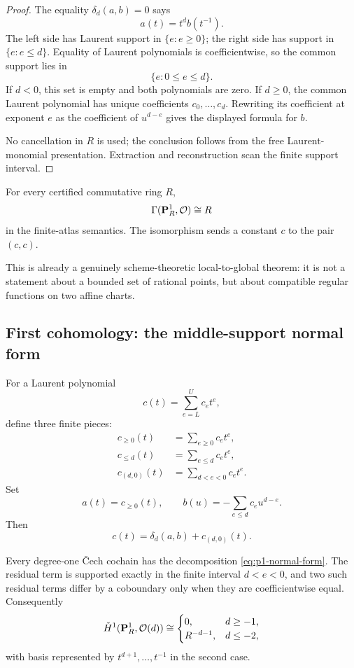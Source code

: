 \begin{proof}
The equality $\delta_d(a,b)=0$ says
\[
                         a(t)=t^d b(t^{-1}).
\]
The left side has Laurent support in $\{e:e\geq0\}$; the right side has support in
$\{e:e\leq d\}$.  Equality of Laurent polynomials is coefficientwise, so the common support lies in
\[
                         \{e:0\leq e\leq d\}.
\]
If $d<0$, this set is empty and both polynomials are zero.  If $d\geq0$, the common Laurent
polynomial has unique coefficients $c_0,\ldots,c_d$.  Rewriting its coefficient at exponent $e$ as
the coefficient of $u^{d-e}$ gives the displayed formula for $b$.

No cancellation in $R$ is used; the conclusion follows from the free Laurent-monomial
presentation.  Extraction and reconstruction scan the finite support interval.
\end{proof}

\begin{corollary}\label{cor:p1-global-functions}
For every certified commutative ring $R$,
\[
                         \Gamma(\mathbf P^1_R,\mathcal O)\cong R
\]
in the finite-atlas semantics.  The isomorphism sends a constant $c$ to the pair $(c,c)$.
\end{corollary}

This is already a genuinely scheme-theoretic local-to-global theorem: it is not a statement about a
bounded set of rational points, but about compatible regular functions on two affine charts.

\subsection{First cohomology: the middle-support normal form}

For a Laurent polynomial
\[
                         c(t)=\sum_{e=L}^U c_e t^e,
\]
define three finite pieces:
\begin{align*}
 c_{\geq0}(t)&=\sum_{e\geq0}c_e t^e,\\
 c_{\leq d}(t)&=\sum_{e\leq d}c_e t^e,\\
 c_{(d,0)}(t)&=\sum_{d<e<0}c_e t^e.
\end{align*}
Set
\[
 a(t)=c_{\geq0}(t),
 \qquad
 b(u)=-\sum_{e\leq d}c_e u^{d-e}.
\]
Then
\begin{equation}\label{eq:p1-normal-form}
                     c(t)=\delta_d(a,b)+c_{(d,0)}(t).
\end{equation}

\begin{theorem}\label{thm:p1-h1}
Every degree-one \v{C}ech cochain has the decomposition
\eqref{eq:p1-normal-form}.  The residual term is supported exactly in the finite interval
$d<e<0$, and two such residual terms differ by a coboundary only when they are coefficientwise equal.
Consequently
\[
 \check H^1(\mathbf P^1_R,\mathcal O(d))\cong
 \begin{cases}
   0,&d\geq-1,\\
   R^{-d-1},&d\leq-2,
 \end{cases}
\]
with basis represented by $t^{d+1},\ldots,t^{-1}$ in the second case.
\end{theorem}

